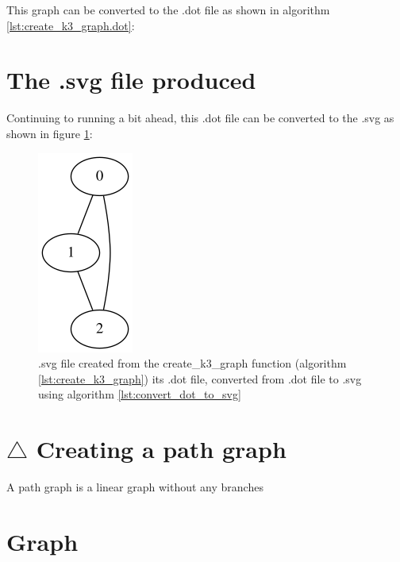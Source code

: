 This graph can be converted to the .dot file as shown in algorithm 
\ref{lst:create_k3_graph.dot}:



\section{The .svg file produced}
\label{subsec:create_k3.svg}

Continuing to running a bit ahead, this .dot file can be converted to the
.svg as shown in figure \ref{fig:create_k3_graph.svg}:

\begin{figure}[!htbp]
  \includegraphics[]{create_k3_graph.png}
  \caption{
    .svg file created from the create\_k3\_graph function 
    (algorithm \ref{lst:create_k3_graph}) its .dot file, 
    converted from .dot file to .svg 
    using algorithm \ref{lst:convert_dot_to_svg}
  }
  \label{fig:create_k3_graph.svg}
\end{figure}

\section{$\triangle$ Creating a path graph}
\label{subsec:create_path_graph}

A path graph is a linear graph without any branches

\section{Graph}

